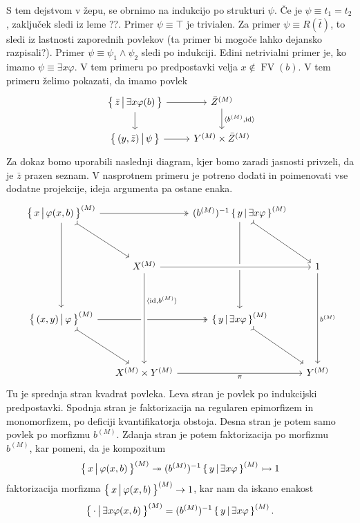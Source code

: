 \documentclass[../kategoricna_logika.tex]{subfiles}
\begin{document}
\begin{dokaz}
  S tem dejstvom v žepu, se obrnimo na indukcijo po strukturi $\psi$.
  Če je $\psi \equiv t_1 = t_2$, zaključek sledi iz leme ??. Primer $\psi \equiv \top$ je trivialen.
  Za primer $\psi \equiv R(\bar{t})$, to sledi iz lastnosti zaporednih povlekov (ta primer bi mogoče lahko dejansko razpisali?).
  Primer $\psi \equiv \psi_1 \land \psi_2$ sledi po indukciji.
  Edini netrivialni primer je, ko imamo $\psi \equiv \exists x \varphi$.
  V tem primeru po predpostavki velja $x \notin \operatorname{FV}(b)$.
  V tem primeru želimo pokazati, da imamo povlek
  \begin{equation*}
  \begin{tikzcd}
    \setb{\bar{z}}{\exists x \varphi(b)} \ar[d] \ar[r] & \interp{\bar{Z}} \ar[d, "\fprod{b^{(M)}, \mathrm{id}}"] \\
    \setb{(y,\bar{z})}{\psi} \ar[r] & Y^{(M)} \times \bar{Z}^{(M)}
  \end{tikzcd}
  \end{equation*}
  Za dokaz bomo uporabili naslednji diagram, kjer bomo zaradi jasnosti privzeli,
  da je $\bar{z}$ prazen seznam.
  V nasprotnem primeru je potreno dodati in poimenovati vse dodatne projekcije,
  ideja argumenta pa ostane enaka.
  \begin{equation*}
  \begin{tikzcd}[column sep=small, row sep=huge]
    \setb{x}{\varphi (x, b)}^{(M)} \ar[dd] \ar[dr, tail] \ar[rr, two heads] & & ( b^{(M)} )^{-1} \setb{y}{\exists x \varphi}^{(M)} \ar[dd] \ar[dr, tail] & \\
    & X^{(M)}  \ar[rr, crossing over] & & 1 \ar[dd, "b^{(M)}"] \\
    \setb{(x,y)}{\varphi}^{(M)} \ar[dr, tail] \ar[rr, two heads] & & \setb{y}{\exists x \varphi}^{(M)} \ar[dr, tail] & \\
    & X^{(M)} \times Y^{(M)} \ar[from=uu, pos=0.3, crossing over, "\fprod{\mathrm{id}, b^{(M)}}"] \ar[rr, "\pi"'] & & Y^{(M)}
  \end{tikzcd}
  \end{equation*}
  Tu je sprednja stran kvadrat povleka. Leva stran je povlek po indukcijski predpostavki.
  Spodnja stran je faktorizacija na regularen epimorfizem in monomorfizem, po deficiji kvantifikatorja obstoja.
  Desna stran je potem samo povlek po morfizmu $b^{(M)}$.
  Zdanja stran je potem faktorizacija po morfizmu $b^{(M)}$, kar pomeni, da je kompozitum
  $$\left\lbrace\, x \,\middle|\, \varphi (x, b) \,\right\rbrace^{(M)} \twoheadrightarrow ( b^{(M)} )^{-1} \left\lbrace\, y \,\middle|\, \exists x \varphi \,\right\rbrace^{(M)} \rightarrowtail 1$$
  faktorizacija morfizma $\left\lbrace\, x \,\middle|\, \varphi (x, b) \,\right\rbrace^{(M)} \to 1$, kar nam da iskano enakost
  $$\left\lbrace\, \cdot \,\middle|\, \exists x \varphi(x,b) \,\right\rbrace^{(M)} = ( b^{(M)} )^{-1} \left\lbrace\, y \,\middle|\, \exists x \varphi \,\right\rbrace^{(M)}.$$
\end{dokaz}
\end{document}
